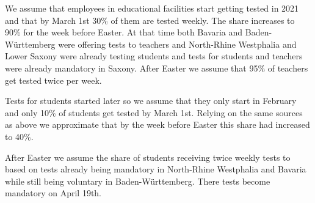 

We assume that employees in educational facilities start getting tested in 2021 and that
by March 1st 30\% of them are tested weekly. The share increases to 90\% for the week
before Easter. At that time both Bavaria and Baden-Württemberg were offering tests to
teachers and North-Rhine Westphalia and Lower Saxony were already testing students and
tests for students and teachers were already mandatory in Saxony. After Easter we assume
that 95\% of teachers get tested twice per week.

Tests for students started later so we assume that they only start in February and only
10\% of students get tested by March 1st. Relying on the same sources as above we
approximate that by the week before Easter this share had increased to 40\%.

After Easter we assume the share of students receiving twice weekly tests to based on
tests already being mandatory in North-Rhine Westphalia and Bavaria while still being
voluntary in Baden-Württemberg. There tests become mandatory on April 19th.













